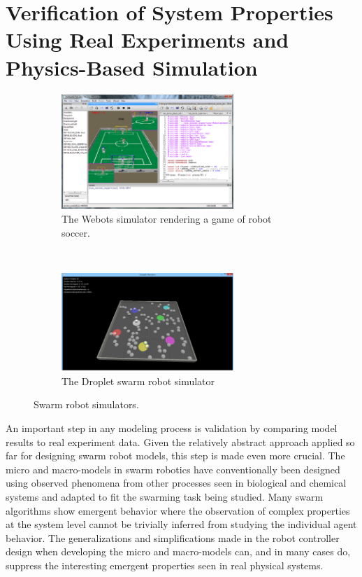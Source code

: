 \documentclass[defaultstyle,12pt]{thesis}
\begin{document}
\section{Verification of System Properties Using Real Experiments and Physics-Based Simulation}
\begin{figure}[!tb]
\begin{subfigure}{.5\textwidth}
\centering\includegraphics[width=6.5cm]{../assets/Webots.png}
\centering\caption{The Webots simulator rendering a game of robot soccer.}\label{fig:webots}
\end{subfigure}~
\begin{subfigure}{.5\textwidth}
\centering\includegraphics[width=6.5cm]{../assets/dsim.png}
\centering\caption{The Droplet swarm robot simulator}\label{fig:dropletsim}
\end{subfigure}
\caption{Swarm robot simulators.}
\end{figure}

An important step in any modeling process is validation by comparing model results to real experiment data. Given the relatively abstract approach applied so far for designing swarm robot models, this step is made even more crucial. The micro and macro-models in swarm robotics have conventionally been designed using observed phenomena from other processes seen in biological and chemical systems and adapted to fit the swarming task being studied. Many swarm algorithms show emergent behavior where the observation of complex properties at the system level cannot be trivially inferred from studying the individual agent behavior. The generalizations and simplifications made in the robot controller design when developing the micro and macro-models can, and in many cases do, suppress the interesting emergent properties seen in real physical systems. 
\end{document}
